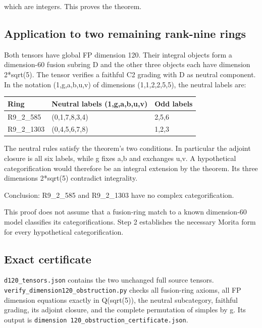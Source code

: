 which are integers. This proves the theorem.

\hypertarget{application-to-two-remaining-rank-nine-rings}{%
\subsection{Application to two remaining rank-nine
rings}\label{application-to-two-remaining-rank-nine-rings}}

Both tensors have global FP dimension 120. Their integral objects form a
dimension-60 fusion subring D and the other three objects each have
dimension 2*sqrt(5). The tensor verifies a faithful C2 grading with D as
neutral component. In the notation (1,g,a,b,u,v) of dimensions
(1,1,2,2,5,5), the neutral labels are:

\begin{longtable}[]{@{}lll@{}}
\toprule\noalign{}
Ring & Neutral labels (1,g,a,b,u,v) & Odd labels \\
\midrule\noalign{}
\endhead
\bottomrule\noalign{}
\endlastfoot
R9\_2\_585 & (0,1,7,8,3,4) & 2,5,6 \\
R9\_2\_1303 & (0,4,5,6,7,8) & 1,2,3 \\
\end{longtable}

The neutral rules satisfy the theorem's two conditions. In particular
the adjoint closure is all six labels, while g fixes a,b and exchanges
u,v. A hypothetical categorification would therefore be an integral
extension by the theorem. Its three dimensions 2*sqrt(5) contradict
integrality.

Conclusion: R9\_2\_585 and R9\_2\_1303 have no complex categorification.

This proof does not assume that a fusion-ring match to a known
dimension-60 model classifies its categorifications. Step 2 establishes
the necessary Morita form for every hypothetical categorification.

\hypertarget{exact-certificate}{%
\subsection{Exact certificate}\label{exact-certificate}}

\texttt{d120\_\allowbreak{}tensor\allowbreak{}s.\allowbreak{}json}
contains the two unchanged full source tensors.
\texttt{verify\allowbreak{}\_\allowbreak{}dimens\allowbreak{}ion120\allowbreak{}\_\allowbreak{}obstru\allowbreak{}ction.\allowbreak{}py}
checks all fusion-ring axioms, all FP dimension equations exactly in
Q(sqrt(5)), the neutral subcategory, faithful grading, its adjoint
closure, and the complete permutation of simples by g. Its output is
\texttt{dimens\allowbreak{}ion 12\allowbreak{}0\_\allowbreak{}obstru\allowbreak{}ction\_\allowbreak{}certif\allowbreak{}icate.\allowbreak{}json}.

